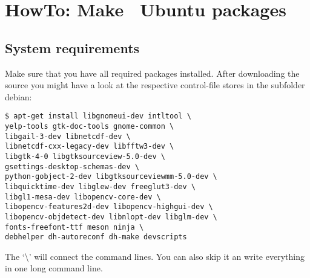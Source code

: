 
\chapter{HowTo: Make \Gxsm\ Ubuntu packages}

\section{System requirements}

Make sure that you have all required packages installed. After downloading the source you might have a look at the respective control-file stores in the subfolder debian:

\begin{verbatim}
$ apt-get install libgnomeui-dev intltool \
yelp-tools gtk-doc-tools gnome-common \ 
libgail-3-dev libnetcdf-dev \
libnetcdf-cxx-legacy-dev libfftw3-dev \
libgtk-4-0 libgtksourceview-5.0-dev \
gsettings-desktop-schemas-dev \ 
python-gobject-2-dev libgtksourceviewmm-5.0-dev \
libquicktime-dev libglew-dev freeglut3-dev \ 
libgl1-mesa-dev libopencv-core-dev \ 
libopencv-features2d-dev libopencv-highgui-dev \
libopencv-objdetect-dev libnlopt-dev libglm-dev \
fonts-freefont-ttf meson ninja \
debhelper dh-autoreconf dh-make devscripts
\end{verbatim}

The `\textbackslash' will connect the command lines. You can also skip it an write everything in one long command line.
 
